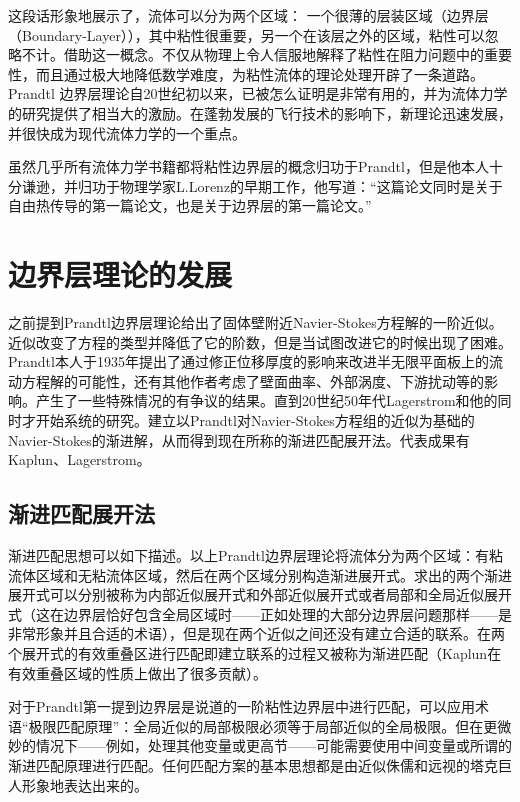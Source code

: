     这段话形象地展示了，流体可以分为两个区域： 一个很薄的层装区域（边界层（Boundary-Layer）），其中粘性很重要，另一个在该层之外的区域，粘性可以忽略不计。借助这一概念。不仅从物理上令人信服地解释了粘性在阻力问题中的重要性，而且通过极大地降低数学难度，为粘性流体的理论处理开辟了一条道路。Prandtl 边界层理论自20世纪初以来，已被怎么证明是非常有用的，并为流体力学的研究提供了相当大的激励。在蓬勃发展的飞行技术的影响下，新理论迅速发展，并很快成为现代流体力学的一个重点。

    虽然几乎所有流体力学书籍都将粘性边界层的概念归功于Prandtl，但是他本人十分谦逊，并归功于物理学家L.Lorenz的早期工作\cite{Lorenz1881}，他写道：“这篇论文同时是关于自由热传导的第一篇论文，也是关于边界层的第一篇论文\cite{Prandtl1952}。”


    \section{边界层理论的发展}\label{sec:发展}
    之前提到Prandtl边界层理论给出了固体壁附近Navier-Stokes方程解的一阶近似。近似改变了方程的类型并降低了它的阶数，但是当试图改进它的时候出现了困难。Prandtl本人于1935年提出了通过修正位移厚度的影响来改进半无限平面板上的流动方程解的可能性\cite{Prandtl1935}，还有其他作者考虑了壁面曲率、外部涡度、下游扰动等的影响。产生了一些特殊情况的有争议的结果。直到20世纪50年代Lagerstrom和他的同时才开始系统的研究。建立以Prandtl对Navier-Stokes方程组的近似为基础的Navier-Stokes的渐进解，从而得到现在所称的渐进匹配展开法。代表成果有Kaplun\cite{Lagerstrom1967}、Lagerstrom\cite{Lagerstrom1989}。

		\subsection{渐进匹配展开法}\label{sub:渐进匹配法}
 
        渐进匹配思想可以如下描述。以上Prandtl边界层理论将流体分为两个区域：有粘流体区域和无粘流体区域，然后在两个区域分别构造渐进展开式。求出的两个渐进展开式可以分别被称为内部近似展开式和外部近似展开式或者局部和全局近似展开式（这在边界层恰好包含全局区域时——正如处理的大部分边界层问题那样——是非常形象并且合适的术语），但是现在两个近似之间还没有建立合适的联系。在两个展开式的有效重叠区进行匹配即建立联系的过程又被称为渐进匹配（Kaplun在有效重叠区域的性质上做出了很多贡献）。

        对于Prandtl第一提到边界层是说道的一阶粘性边界层中进行匹配，可以应用术语“极限匹配原理”：全局近似的局部极限必须等于局部近似的全局极限。但在更微妙的情况下——例如，处理其他变量或更高节——可能需要使用中间变量或所谓的渐进匹配原理进行匹配。任何匹配方案的基本思想都是由近似侏儒和远视的塔克巨人形象地表达出来的\cite{Tuck1971}。

